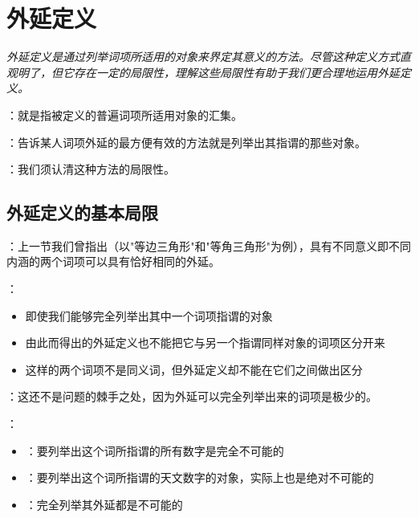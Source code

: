\section{外延定义}

\begin{logicbox}[title=引言]
\textit{外延定义是通过列举词项所适用的对象来界定其意义的方法。尽管这种定义方式直观明了，但它存在一定的局限性，理解这些局限性有助于我们更合理地运用外延定义。}
\end{logicbox}

\begin{theorembox}[title=外延定义的基本概念]
：就是指被定义的普遍词项所适用对象的汇集。

：告诉某人词项外延的最方便有效的方法就是列举出其指谓的那些对象。

：我们须认清这种方法的局限性。
\end{theorembox}

\subsection{外延定义的基本局限}

\begin{theorembox}[title=局限一：相同外延的不同内涵]
：上一节我们曾指出（以"等边三角形"和"等角三角形"为例），具有不同意义即不同内涵的两个词项可以具有恰好相同的外延。

：
\begin{itemize}
  \item 即使我们能够完全列举出其中一个词项指谓的对象
  \item 由此而得出的外延定义也不能把它与另一个指谓同样对象的词项区分开来
  \item 这样的两个词项不是同义词，但外延定义却不能在它们之间做出区分
\end{itemize}
\end{theorembox}

\begin{theorembox}[title=局限二：完全列举的不可能性]
：这还不是问题的棘手之处，因为外延可以完全列举出来的词项是极少的。

：
\begin{itemize}
  \item {}：要列举出这个词所指谓的所有数字是完全不可能的
  \item {}：要列举出这个词所指谓的天文数字的对象，实际上也是绝对不可能的
  \item {}：完全列举其外延都是不可能的
\end{itemize}
\end{theorembox}

